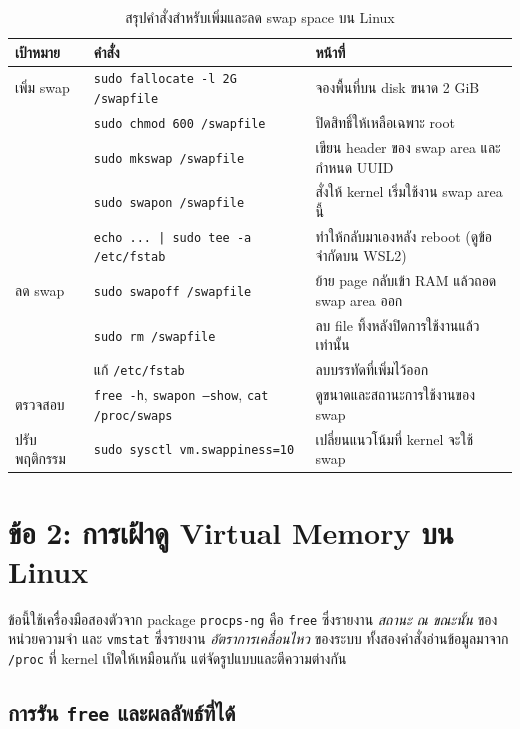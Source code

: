 \documentclass[a4paper,11pt]{article}
\newcommand{\code}[1]{\texttt{#1}}
\begin{document}
\begin{table}[H]
\centering\small
\caption{สรุปคำสั่งสำหรับเพิ่มและลด swap space บน Linux}
\begin{tabular}{@{}p{2.2cm}p{6.6cm}p{6.8cm}@{}}
\toprule
\textbf{เป้าหมาย} & \textbf{คำสั่ง} & \textbf{หน้าที่} \\
\midrule
เพิ่ม swap & \code{sudo fallocate -l 2G /swapfile} & จองพื้นที่บน disk ขนาด 2 GiB \\
 & \code{sudo chmod 600 /swapfile} & ปิดสิทธิ์ให้เหลือเฉพาะ root \\
 & \code{sudo mkswap /swapfile} & เขียน header ของ swap area และกำหนด UUID \\
 & \code{sudo swapon /swapfile} & สั่งให้ kernel เริ่มใช้งาน swap area นี้ \\
 & \code{echo ... | sudo tee -a /etc/fstab} & ทำให้กลับมาเองหลัง reboot (ดูข้อจำกัดบน WSL2) \\
\midrule
ลด swap & \code{sudo swapoff /swapfile} & ย้าย page กลับเข้า RAM แล้วถอด swap area ออก \\
 & \code{sudo rm /swapfile} & ลบ file ทิ้งหลังปิดการใช้งานแล้วเท่านั้น \\
 & แก้ \code{/etc/fstab} & ลบบรรทัดที่เพิ่มไว้ออก \\
\midrule
ตรวจสอบ & \code{free -h}, \code{swapon --show}, \code{cat /proc/swaps} & ดูขนาดและสถานะการใช้งานของ swap \\
\midrule
ปรับพฤติกรรม & \code{sudo sysctl vm.swappiness=10} & เปลี่ยนแนวโน้มที่ kernel จะใช้ swap \\
\bottomrule
\end{tabular}
\end{table}

\section{ข้อ 2: การเฝ้าดู Virtual Memory บน Linux}

ข้อนี้ใช้เครื่องมือสองตัวจาก package \code{procps-ng} คือ \code{free} ซึ่งรายงาน \textit{สถานะ ณ ขณะนั้น} ของหน่วยความจำ และ \code{vmstat} ซึ่งรายงาน \textit{อัตราการเคลื่อนไหว} ของระบบ ทั้งสองคำสั่งอ่านข้อมูลมาจาก \code{/proc} ที่ kernel เปิดให้เหมือนกัน แต่จัดรูปแบบและตีความต่างกัน

\subsection{การรัน \code{free} และผลลัพธ์ที่ได้}
\end{document}
